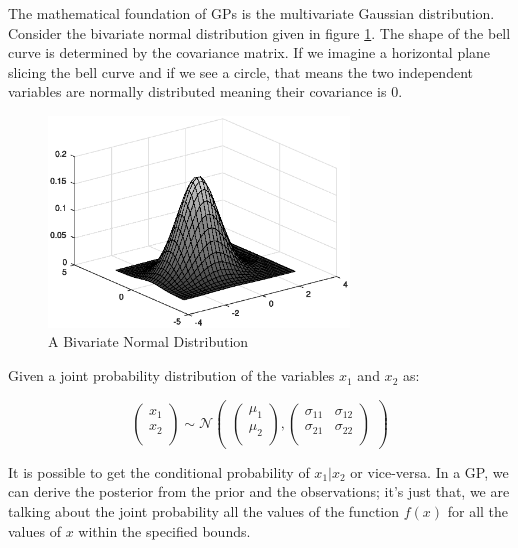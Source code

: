 \documentclass[12pt]{report}
\begin{document}
The mathematical foundation of GPs is the multivariate Gaussian distribution. Consider the bivariate normal distribution given in figure \ref{fig:bvnpdf}. The shape of the bell curve is determined by the covariance matrix. If we imagine a horizontal plane slicing the bell curve and if we see a circle, that means the two independent variables are normally distributed meaning their covariance is $0$.\par  
\begin{figure}[htp]
	\centering 
	\includegraphics[width=8cm]{bvnpdf_gray.eps}
	\caption{A Bivariate Normal Distribution}
   \label{fig:bvnpdf}
\end{figure}
Given a joint probability distribution of the variables $x_1$ and $x_2$ as:

\begin{equation}
\begin{pmatrix}x_1\\
x_2\\
\end{pmatrix} 
\sim \mathcal{N}\begin{pmatrix} 
\begin{pmatrix}\mu_1\\
\mu_2\\
\end{pmatrix} ,\begin{pmatrix}\sigma_{11} & \sigma_{12}\\
\sigma_{21} & \sigma_{22}\\
\end{pmatrix} 
\end{pmatrix}
\end{equation}

It is possible to get the conditional probability of $x_1 | x_2$ or vice-versa. In a GP, we can derive the posterior from the prior and the observations; it's just that,  we are talking about the joint probability all the values of the function $f(x)$ for all the values of $x$ within the specified bounds.
\end{document}
